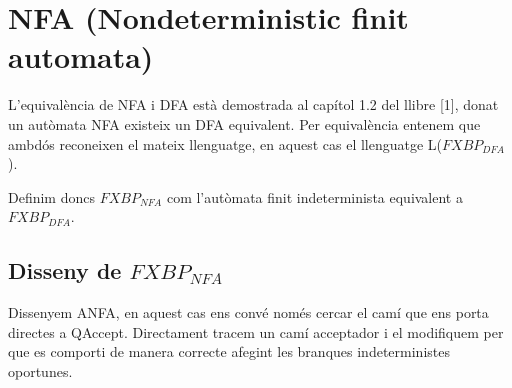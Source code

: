 \documentclass[12pt,a4paper]{report}
\def \dfa{$FXBP_{DFA} $}
\def \nfa{$FXBP_{NFA} $}
\begin{document}
\clearpage

\section{NFA (Nondeterministic finit automata)}

L’equivalència de NFA i DFA està demostrada al capítol 1.2 del llibre [1], donat un autòmata NFA existeix un DFA equivalent. Per equivalència entenem que ambdós reconeixen el mateix llenguatge, en aquest cas el llenguatge L(\dfa{}).

Definim doncs \nfa{} com l’autòmata finit indeterminista equivalent a \dfa{}.

\subsection{Disseny de \nfa{}}

Dissenyem ANFA, en aquest cas ens convé només cercar el camí que ens porta directes a QAccept. Directament tracem un camí acceptador i el modifiquem per que es comporti de manera correcte afegint les branques indeterministes oportunes.
\end{document}
